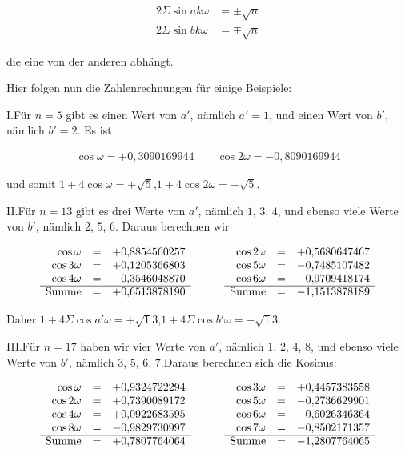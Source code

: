 \[
\begin{aligned}
2\Sigma\sin ak\omega&=\pm\surd n\\
2\Sigma\sin bk\omega&=\mp\surd n
\end{aligned}
\]

die eine von der anderen abhängt.


Hier folgen nun die Zahlenrechnungen für einige Beispiele:

I.\quad Für $n=5$ gibt es einen Wert von $a'$, nämlich $a'=1$, und einen Wert von $b'$, nämlich $b'=2$. Es ist

\[
\begin{aligned}
\cos\omega=+0{,}3090169944\qquad\cos2\omega=-0{,}8090169944
\end{aligned}
\]

und somit $1+4\cos\omega=+\surd5$,\quad $1+4\cos2\omega=-\surd5$.

II.\quad Für $n=13$ gibt es drei Werte von $a'$, nämlich $1$, $3$, $4$, und ebenso viele Werte von $b'$, nämlich $2$, $5$, $6$. Daraus berechnen wir

{\small\setlength{\arraycolsep}{2.5pt}\renewcommand{\arraystretch}{1.15}
\[
\begin{array}{rclcrcl}
\cos\omega&=&+0{,}8854560257&\qquad&\cos2\omega&=&+0{,}5680647467\\
\cos3\omega&=&+0{,}1205366803&\qquad&\cos5\omega&=&-0{,}7485107482\\
\cos4\omega&=&-0{,}3546048870&\qquad&\cos6\omega&=&-0{,}9709418174\\\cline{1-3}\cline{5-7}
\text{Summe}&=&+0{,}6513878190&\qquad&\text{Summe}&=&-1{,}1513878189
\end{array}
\]
}

Daher $1+4\Sigma\cos a'\omega=+\surd13$,\quad $1+4\Sigma\cos b'\omega=-\surd13$.

III.\quad Für $n=17$ haben wir vier Werte von $a'$, nämlich $1$, $2$, $4$, $8$, und ebenso viele Werte von $b'$, nämlich $3$, $5$, $6$, $7$.\quad Daraus berechnen sich die Kosinus:

{\small\setlength{\arraycolsep}{2.5pt}\renewcommand{\arraystretch}{1.15}
\[
\begin{array}{rclcrcl}
\cos\omega&=&+0{,}9324722294&\qquad&\cos3\omega&=&+0{,}4457383558\\
\cos2\omega&=&+0{,}7390089172&\qquad&\cos5\omega&=&-0{,}2736629901\\
\cos4\omega&=&+0{,}0922683595&\qquad&\cos6\omega&=&-0{,}6026346364\\
\cos8\omega&=&-0{,}9829730997&\qquad&\cos7\omega&=&-0{,}8502171357\\\cline{1-3}\cline{5-7}
\text{Summe}&=&+0{,}7807764064&\qquad&\text{Summe}&=&-1{,}2807764065
\end{array}
\]
}

